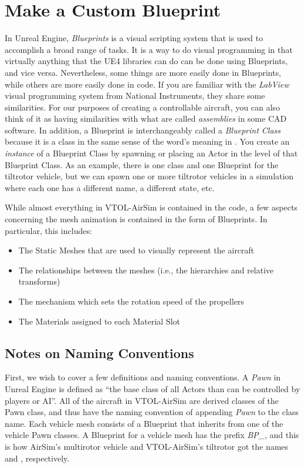 \section{Make a Custom Blueprint}\label{sec:blueprint}
In Unreal Engine, \textit{Blueprints} is a visual scripting system that is used to accomplish a broad range of tasks. It is a way to do visual programming in that virtually anything that the UE4 \CC libraries can do can be done using Blueprints, and vice versa. Nevertheless, some things are more easily done in Blueprints, while others are more easily done in \CC code. If you are familiar with the \textit{LabView} visual programming system from National Instruments, they share some similarities. For our purposes of creating a controllable aircraft, you can also think of it as having similarities with what are called \textit{assemblies} in some CAD software. In addition, a Blueprint is interchangeably called a \textit{Blueprint Class} because it is a class in the same sense of the word's meaning in \CCd. You create an \textit{instance} of a Blueprint Class by spawning or placing an Actor in the level of that Blueprint Class. As an example, there is one  \CC class and one  Blueprint for the tiltrotor vehicle, but we can spawn one or more tiltrotor vehicles in a simulation where each one has a different name, a different state, etc.

While almost everything in VTOL-AirSim is contained in the \CC code, a few aspects concerning the mesh animation is contained in the form of Blueprints. In particular, this includes:
\begin{itemize}
    \item The Static Meshes that are used to visually represent the aircraft
    \item The relationships between the meshes (i.e., the hierarchies and relative transforms)
    \item The mechanism which sets the rotation speed of the propellers
    \item The Materials assigned to each Material Slot
\end{itemize}

\subsection{Notes on Naming Conventions}
First, we wish to cover a few definitions and naming conventions. A \textit{Pawn} in Unreal Engine is defined as ``the base class of all Actors than can be controlled by players or AI''. All of the aircraft in VTOL-AirSim are derived classes of the Pawn \CC class, and thus have the naming convention of appending \textit{Pawn} to the class name. Each vehicle mesh consists of a Blueprint that inherits from one of the vehicle Pawn \CC classes. A Blueprint for a vehicle mesh has the prefix \textit{BP\_}, and this is how AirSim's multirotor vehicle and VTOL-AirSim's tiltrotor got the names  and , respectively.

